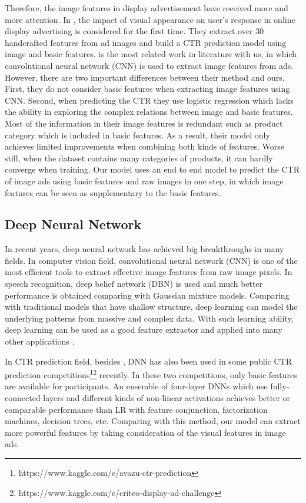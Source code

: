 \documentclass{sig-alternate}
\begin{document}
Therefore, the image features in display advertisement have received more and more attention. In \cite{azimi2012impact,cheng2012multimedia}, the impact of  visual appearance  on user's response in online display advertising is considered for the first time. They extract over 30 handcrafted features from ad images and build a CTR prediction model using image and basic  features.   \cite{Mo:2015:IFL:2832747.2832769} is the most related work  in literature with us, in which convolutional neural network (CNN) is used to extract image features from ads. However, there are two important differences between their method and ours.   First, they do not consider basic features when extracting image features using CNN. Second,  when predicting the CTR they  use logistic regression which lacks the ability in exploring the complex relations between image and basic features. Most of the information in their image features is redundant  such as product category which is included in basic features. As a result, their model only achieves limited improvements when combining both kinds of features. Worse still, when the dataset contains many categories of products, it can hardly converge when training. Our model uses an end to end model to predict the CTR of image ads using basic features and raw images in one step, in which image features can be seen as  supplementary to the basic features.
\subsection{Deep Neural Network} 
In recent years, deep neural network has achieved big breakthroughs in many fields. In computer vision field, convolutional neural network (CNN) \cite{NIPS2012_4824} is one of the most efficient tools to extract effective image features from raw image pixels.  In speech recognition, deep belief network (DBN) \cite{hinton2012deep} is used and much better performance is obtained comparing with Gaussian mixture models. Comparing with traditional models that have shallow structure, deep learning can model the underlying patterns  from massive and complex data. With such learning ability, deep learning can be used as a good feature extractor and applied into many other applications \cite{ren2015faster,simonyan2014two}.

In CTR prediction field, besides \cite{zhang2016deep}, DNN has also been used in some public CTR prediction  competitions\footnote{https://www.kaggle.com/c/avazu-ctr-prediction}\footnote{https://www.kaggle.com/c/criteo-display-ad-challenge} recently. In these two competitions, only basic features are available for participants. An ensemble of four-layer DNNs which use fully-connected layers and different kinds of non-linear activations  achieves better or comparable performance than LR with feature conjunction, factorization machines, decision trees, etc. Comparing with this method, our model can extract more powerful features by taking consideration  of the visual features in image ads. 
\end{document}

